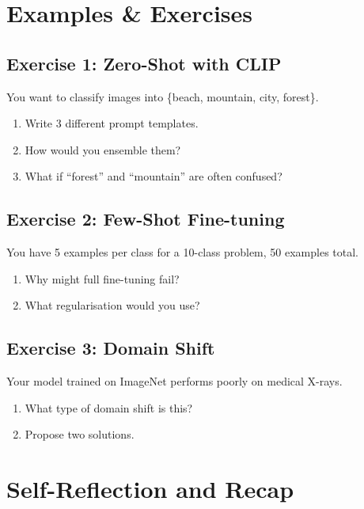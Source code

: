 \newpage
\section{Examples \& Exercises}

\subsection{Exercise 1: Zero-Shot with CLIP}

You want to classify images into \{beach, mountain, city, forest\}.

\begin{enumerate}
    \item Write 3 different prompt templates.
    \item How would you ensemble them?
    \item What if ``forest'' and ``mountain'' are often confused?
\end{enumerate}

\subsection{Exercise 2: Few-Shot Fine-tuning}

You have 5 examples per class for a 10-class problem, 50 examples total.

\begin{enumerate}
    \item Why might full fine-tuning fail?
    \item What regularisation would you use?
\end{enumerate}

\subsection{Exercise 3: Domain Shift}

Your model trained on ImageNet performs poorly on medical X-rays.

\begin{enumerate}
    \item What type of domain shift is this?
    \item Propose two solutions.
\end{enumerate}


\section{Self-Reflection and Recap}

